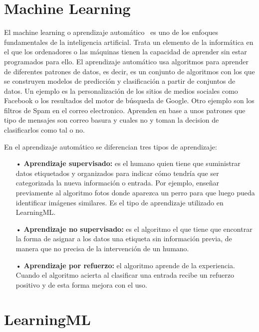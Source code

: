 \documentclass[a4paper, 12pt]{book}
\begin{document}
\section{Machine Learning} 
\label{sec:MachineLearning}
El machine learning o aprendizaje automático~\cite{rouhiainen2018inteligencia}  es uno de los enfoques fundamentales de la inteligencia artificial. Trata un elemento de la informática en el que los ordenadores o las máquinas tienen la capacidad de aprender sin estar programados para ello. El aprendizaje automático usa algoritmos para aprender de diferentes patrones de datos, es decir, es un conjunto de algoritmos con los que se construyen modelos de predicción y clasificación a partir de conjuntos de datos. Un ejemplo es la personalización de los sitios de medios sociales como Facebook o los resultados del motor de
búsqueda de Google. Otro ejemplo son  los filtros de Spam en el correo electronico. Aprenden en base a unos patrones que tipo de mensajes son correo basura y cuales no y toman la decision de clasificarlos como tal o no.

En el aprendizaje automático se diferencian tres tipos de aprendizaje:

\begin{itemize}

	\item[•] \textbf{Aprendizaje supervisado:} es el humano quien tiene que suministrar datos etiquetados y organizados para indicar cómo tendría que ser categorizada la nueva información o entrada. Por ejemplo, enseñar previamente al algoritmo fotos donde aparezca un perro para que luego pueda identificar imágenes similares. Es el tipo de aprendizaje utilizado en LearningML.
	
	\item[•] \textbf{Aprendizaje no supervisado:} es el algoritmo el que tiene que encontrar la forma de asignar a los datos una etiqueta sin información previa, de manera que no precisa de la intervención de un humano.
	
	\item[•] \textbf{Aprendizaje por refuerzo:} el algoritmo aprende de la experiencia. Cuando el algoritmo acierta al clasificar una entrada recibe un refuerzo positivo y de esta forma mejora con el uso.
	
\end{itemize}

\section{LearningML} 
\label{sec:LearningML}
\end{document}
